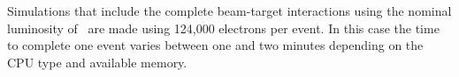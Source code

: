 \noindent Simulations that include the complete beam-target interactions using the nominal luminosity
of \cLuminosity\ are made using 124,000 electrons per event. In this case the time to complete one event varies
between one and two minutes depending on the CPU type and available memory.

































